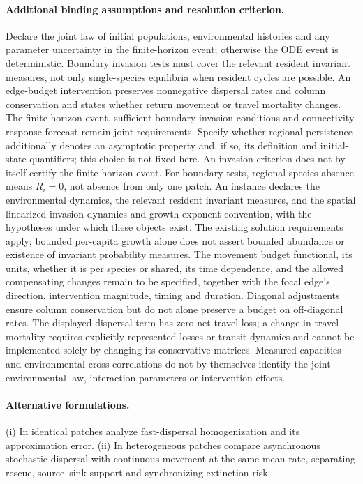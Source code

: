 \documentclass[11pt]{article}
\begin{document}
\paragraph{Additional binding assumptions and resolution criterion.} Declare the joint law of initial populations, environmental histories and any parameter uncertainty in the finite-horizon event; otherwise the ODE event is deterministic. Boundary invasion tests must cover the relevant resident invariant measures, not only single-species equilibria when resident cycles are possible. An edge-budget intervention preserves nonnegative dispersal rates and column conservation and states whether return movement or travel mortality changes. The finite-horizon event, sufficient boundary invasion conditions and connectivity-response forecast remain joint requirements. Specify whether regional persistence additionally denotes an asymptotic property and, if so, its definition and initial-state quantifiers; this choice is not fixed here. An invasion criterion does not by itself certify the finite-horizon event. For boundary tests, regional species absence means $R_i=0$, not absence from only one patch. An instance declares the environmental dynamics, the relevant resident invariant measures, and the spatial linearized invasion dynamics and growth-exponent convention, with the hypotheses under which these objects exist. The existing solution requirements apply; bounded per-capita growth alone does not assert bounded abundance or existence of invariant probability measures. The movement budget functional, its units, whether it is per species or shared, its time dependence, and the allowed compensating changes remain to be specified, together with the focal edge's direction, intervention magnitude, timing and duration. Diagonal adjustments ensure column conservation but do not alone preserve a budget on off-diagonal rates. The displayed dispersal term has zero net travel loss; a change in travel mortality requires explicitly represented losses or transit dynamics and cannot be implemented solely by changing its conservative matrices. Measured capacities and environmental cross-correlations do not by themselves identify the joint environmental law, interaction parameters or intervention effects.

\paragraph{Alternative formulations.} (i) In identical patches analyze fast-dispersal homogenization and its approximation error. (ii) In heterogeneous patches compare asynchronous stochastic dispersal with continuous movement at the same mean rate, separating rescue, source--sink support and synchronizing extinction risk.
\end{document}
